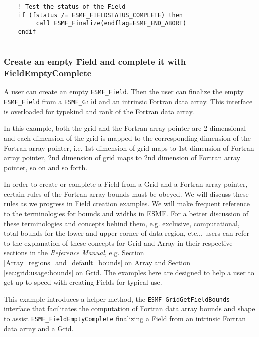  \begin{verbatim}
    ! Test the status of the Field
    if (fstatus /= ESMF_FIELDSTATUS_COMPLETE) then
         call ESMF_Finalize(endflag=ESMF_END_ABORT)
    endif
 
\end{verbatim}
 

  \subsubsection{Create an empty Field and complete it with FieldEmptyComplete}
  \label{sec:field:usage:create_empty}
  
    A user can create an empty {\tt ESMF\_Field}.
    Then the user can finalize the empty {\tt ESMF\_Field} from a {\tt ESMF\_Grid}
    and an intrinsic
    Fortran data array. This interface is overloaded for typekind and rank
    of the Fortran data array.
  
    In this example, both the grid and the Fortran array pointer are 2 dimensional
    and each dimension of the grid is mapped to the corresponding dimension of the
    Fortran array pointer, i.e. 1st dimension of grid maps to 1st dimension of
    Fortran array pointer, 2nd dimension of grid maps to 2nd dimension of
    Fortran array pointer, so on and so forth.
  
    In order to create or complete a Field from a Grid and a Fortran array pointer,
    certain rules of the Fortran array bounds must be obeyed. We will discuss these
    rules as we progress in Field creation examples.  We will make
    frequent reference to the terminologies for bounds and widths in ESMF.
    For a better discussion of
    these terminologies and concepts behind them,
    e.g. exclusive, computational, total bounds
    for the lower and upper corner of data region, etc.., users can refer to
    the explanation of these concepts for Grid and Array in their respective sections
    in the {\it Reference Manual}, e.g. Section \ref{Array_regions_and_default_bounds} on Array
    and Section \ref{sec:grid:usage:bounds} on Grid.
    The examples here are designed to help a user to get up to speed with
    creating Fields for typical use.
  
    This example introduces a helper method, the {\tt ESMF\_GridGetFieldBounds}
    interface that facilitates the computation of Fortran data array bounds
    and shape to assist {\tt ESMF\_FieldEmptyComplete} finalizing a Field from an
    intrinsic Fortran data array and a Grid.
   
